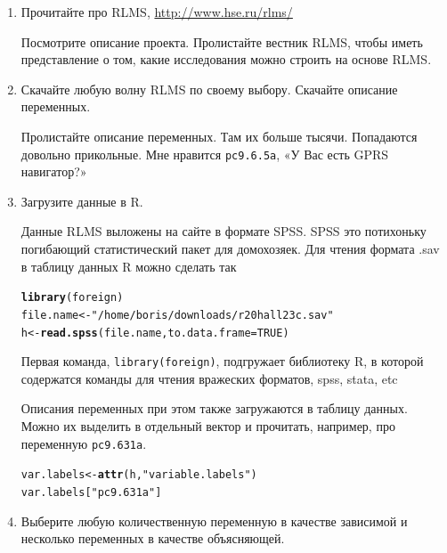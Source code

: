 \documentclass[12pt, a4paper]{article}\usepackage[]{graphicx}\usepackage[]{color}
\makeatletter
\newcommand{\hlnum}[1]{\textcolor[rgb]{0.686,0.059,0.569}{#1}}%
\newcommand{\hlstr}[1]{\textcolor[rgb]{0.192,0.494,0.8}{#1}}%
\newcommand{\hlstd}[1]{\textcolor[rgb]{0.345,0.345,0.345}{#1}}%
\newcommand{\hlkwb}[1]{\textcolor[rgb]{0.69,0.353,0.396}{#1}}%
\newcommand{\hlkwc}[1]{\textcolor[rgb]{0.333,0.667,0.333}{#1}}%
\newcommand{\hlkwd}[1]{\textcolor[rgb]{0.737,0.353,0.396}{\textbf{#1}}}%
\newenvironment{kframe}{%
 \def\at@end@of@kframe{}%
 \ifinner\ifhmode%
  \def\at@end@of@kframe{\end{minipage}}%
  \begin{minipage}{\columnwidth}%
 \fi\fi%
 \def\FrameCommand##1{\hskip\@totalleftmargin \hskip-\fboxsep
 \colorbox{shadecolor}{##1}\hskip-\fboxsep
     \hskip-\linewidth \hskip-\@totalleftmargin \hskip\columnwidth}%
 \MakeFramed {\advance\hsize-\width
   \@totalleftmargin\z@ \linewidth\hsize
   \@setminipage}}%
 {\par\unskip\endMakeFramed%
 \at@end@of@kframe}
\newenvironment{knitrout}{}{} %
\makeatother
\begin{document}
\begin{enumerate}
\item Прочитайте про RLMS, \url{http://www.hse.ru/rlms/}

Посмотрите описание проекта. Пролистайте вестник RLMS, чтобы иметь представление о том, какие исследования можно строить на основе RLMS.

\item Скачайте любую волну RLMS по своему выбору. Скачайте описание переменных.

Пролистайте описание переменных. Там их больше тысячи. Попадаются довольно прикольные. Мне нравится \verb|pc9.6.5a|, «У Вас есть GPRS навигатор?»

\item Загрузите данные в R.

Данные RLMS выложены на сайте в формате SPSS. SPSS это потихоньку погибающий статистический пакет для домохозяек. Для чтения формата .sav в таблицу данных R можно сделать так
\begin{knitrout}
\color{fgcolor}\begin{kframe}
\begin{alltt}
\hlkwd{library}\hlstd{(foreign)}
\hlstd{file.name} \hlkwb{<-} \hlstr{"/home/boris/downloads/r20hall23c.sav"}
\hlstd{h} \hlkwb{<-} \hlkwd{read.spss}\hlstd{(file.name,} \hlkwc{to.data.frame} \hlstd{=} \hlnum{TRUE}\hlstd{)}
\end{alltt}
\end{kframe}
\end{knitrout}
Первая команда, \verb|library(foreign)|, подгружает библиотеку R, в которой содержатся команды для чтения вражеских форматов, spss, stata, etc

Описания переменных при этом также загружаются в таблицу данных. Можно их выделить в отдельный вектор и прочитать, например, про переменную \verb|pc9.631a|.
\begin{knitrout}
\color{fgcolor}\begin{kframe}
\begin{alltt}
\hlstd{var.labels} \hlkwb{<-} \hlkwd{attr}\hlstd{(h,} \hlstr{"variable.labels"}\hlstd{)}
\hlstd{var.labels[}\hlstr{"pc9.631a"}\hlstd{]}
\end{alltt}
\end{kframe}
\end{knitrout}

\item Выберите любую количественную переменную в качестве зависимой и несколько переменных в качестве объясняющей.


\end{enumerate}
\end{document}
